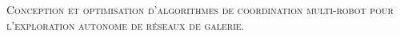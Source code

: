 \documentclass{article}
\numberwithin{figure}{section}
\numberwithin{table}{section}
\begin{document}
\begin{titlepage}
    \begin{center}
        \Large
        \vfill
        \textsc{Conception et optimisation d'algorithmes de coordination multi-robot pour l'exploration autonome de réseaux de galerie.}
        \vfill
    \end{center}
\end{titlepage}
\newpage



\newpage




\newpage
{}

\footnotesize{}
\end{document}
